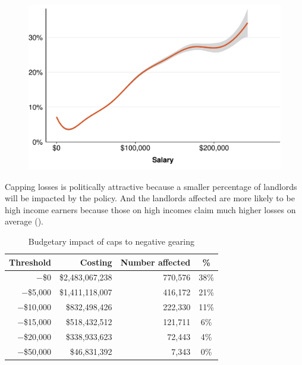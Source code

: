 \documentclass{grattan}\usepackage[]{graphicx}\usepackage[]{color}
\begin{document}
\begin{figure}

\includegraphics[width=\columnwidth]{CGT-NG-atlas//NG-vs-salary-1}
\end{figure}

Capping losses is politically attractive because a smaller percentage of landlords will be impacted by the policy. And the landlords affected are more likely to be high income earners because those on high incomes claim much higher losses on average (). 

\begin{table}
\caption{Budgetary impact of caps to negative gearing}\label{tbl:cap-NG}
\begin{tabularx}{\linewidth}{rrrS}
  \toprule
{\textbf{Threshold}} & {\textbf{Costing}} & {\textbf{Number affected}} & {\textbf{\%}} \\ 
  \midrule
$-$\$0 & \$2,483,067,238 & 770,576 & 38\% \\ 
  $-$\$5,000 & \$1,411,118,007 & 416,172 & 21\% \\ 
  $-$\$10,000 & \$832,498,426 & 222,330 & 11\% \\ 
  $-$\$15,000 & \$518,432,512 & 121,711 & 6\% \\ 
  $-$\$20,000 & \$338,933,623 & 72,443 & 4\% \\ 
  $-$\$50,000 & \$46,831,392 & 7,343 & 0\% \\ 
   \bottomrule
\end{tabularx}

\end{table}
\end{document}
